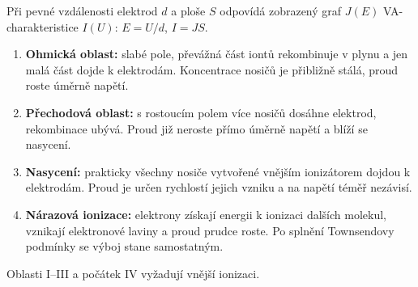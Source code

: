 Při pevné vzdálenosti elektrod $d$ a ploše $S$ odpovídá zobrazený graf $J(E)$ VA-charakteristice $I(U)$: $E=U/d$, $I=JS$.
\begin{enumerate}
\item \textbf{Ohmická oblast:} slabé pole, převážná část iontů rekombinuje v plynu a jen malá část dojde k elektrodám. Koncentrace nosičů je přibližně stálá, proud roste úměrně napětí.
\item \textbf{Přechodová oblast:} s rostoucím polem více nosičů dosáhne elektrod, rekombinace ubývá. Proud již neroste přímo úměrně napětí a blíží se nasycení.
\item \textbf{Nasycení:} prakticky všechny nosiče vytvořené vnějším ionizátorem dojdou k elektrodám. Proud je určen rychlostí jejich vzniku a na napětí téměř nezávisí.
\item \textbf{Nárazová ionizace:} elektrony získají energii k ionizaci dalších molekul, vznikají elektronové laviny a proud prudce roste. Po splnění Townsendovy podmínky se výboj stane samostatným.
\end{enumerate}
Oblasti I--III a počátek IV vyžadují vnější ionizaci.
